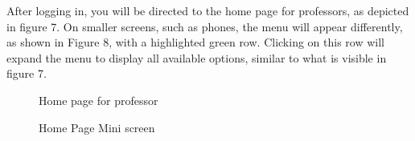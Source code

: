 \documentclass[12pt]{article}
\begin{document}
After logging in, you will be directed to the home page for professors, as depicted in figure 7. On smaller screens, such as phones, the menu will appear differently, as shown in Figure 8, with a highlighted green row. Clicking on this row will expand the menu to display all available options, similar to  what is visible in figure 7.
\begin{figure}[H]
    \centering
    \caption{Home page for professor}
    \label{7}
\end{figure}
\begin{figure}[H]
    \centering
    \label{8}
    \caption{Home Page Mini screen}
\end{figure}
\end{document}
